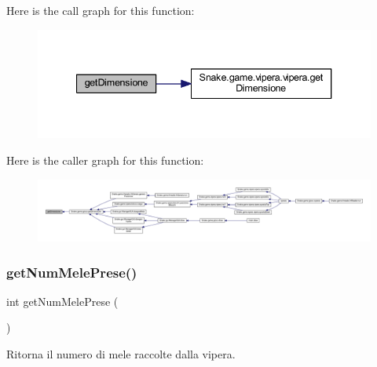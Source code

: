 Here is the call graph for this function\+:
\nopagebreak
\begin{figure}[H]
\begin{center}
\leavevmode
\includegraphics[width=340pt]{class_snake_1_1game_1_1utility_1_1game_manager_acda812adf1e0abdaf30cf3a2e2efaa07_cgraph}
\end{center}
\end{figure}
Here is the caller graph for this function\+:
\nopagebreak
\begin{figure}[H]
\begin{center}
\leavevmode
\includegraphics[width=350pt]{class_snake_1_1game_1_1utility_1_1game_manager_acda812adf1e0abdaf30cf3a2e2efaa07_icgraph}
\end{center}
\end{figure}
\mbox{\label{class_snake_1_1game_1_1utility_1_1game_manager_a5af927824d6cd9c9c30b0607cbdab546}} 
\subsubsection{\texorpdfstring{get\+Num\+Mele\+Prese()}{getNumMelePrese()}}
{\footnotesize\ttfamily int get\+Num\+Mele\+Prese (\begin{DoxyParamCaption}{ }\end{DoxyParamCaption})}



Ritorna il numero di mele raccolte dalla vipera. 



